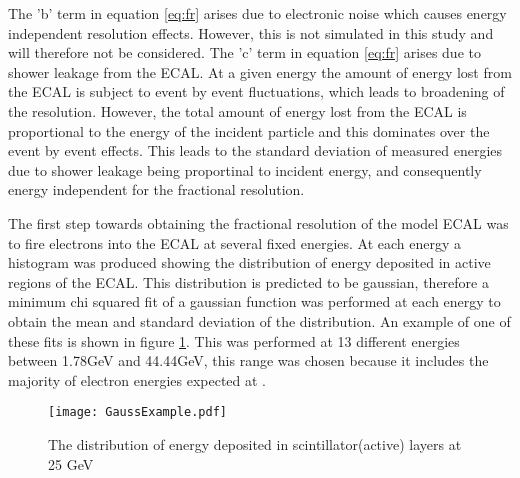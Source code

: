 The 'b' term in equation \ref{eq:fr} arises due to electronic noise which causes energy independent resolution effects.  However, this is not simulated in this study and will therefore not be considered.  The 'c' term in equation \ref{eq:fr} arises due to shower leakage from the ECAL.  At a given energy the amount of energy lost from the ECAL is subject to event by event fluctuations, which leads to broadening of the resolution.  However, the total amount of energy lost from the ECAL is proportional to the energy of the incident particle and this dominates over the event by event effects.  This leads to the standard deviation of measured energies due to shower leakage being proportinal to incident energy, and consequently energy independent for the fractional resolution.

The first step towards obtaining the fractional resolution of the model ECAL was to fire electrons into the ECAL at several fixed energies.  At each energy a histogram was produced showing the distribution of energy deposited in active regions of the ECAL.  This distribution is predicted to be gaussian, therefore a minimum chi squared fit of a gaussian function was performed at each energy to obtain the mean and standard deviation of the distribution. An example of one of these fits is shown in figure \ref{fig:Gauss}.  This was performed at 13 different energies between 1.78GeV and 44.44GeV, this range was chosen because it includes the majority of electron energies expected at \lhcb.

\begin{figure}[h]
  \centering
  \texttt{[image: GaussExample.pdf]}
  \caption{The distribution of energy deposited in scintillator(active) layers at 25 GeV}
  \label{fig:Gauss}
\end{figure}

